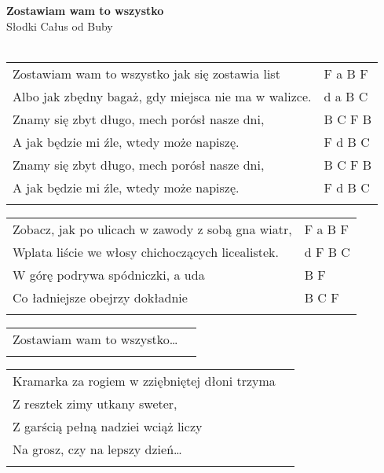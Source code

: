 \documentclass[a5paper]{article}
\begin{document}


\noindent
\fontsize{12pt}{15pt}\selectfont
\textbf{Zostawiam wam to wszystko} \\
\fontsize{8pt}{10pt}\selectfont
Słodki Całus od Buby \\ \\
\fontsize{10pt}{12pt}\selectfont

\begin{tabular}{@{}p{8.50cm}p{3cm}@{}}
\noindent
Zostawiam wam to wszystko jak się zostawia list & F a B F\\
Albo jak zbędny bagaż, gdy miejsca nie ma w walizce. & d a B C\\
Znamy się zbyt długo, mech porósł nasze dni, & B C F B\\
A jak będzie mi źle, wtedy może napiszę. & F d B C\\
Znamy się zbyt długo, mech porósł nasze dni, & B C F B\\
A jak będzie mi źle, wtedy może napiszę. & F d B C \\ \\
\end{tabular}

\noindent
\begin{tabular}{@{}p{9.50cm}p{3cm}@{}}
Zobacz, jak po ulicach w zawody z sobą gna wiatr, & F a B F \\
Wplata liście we włosy chichoczących licealistek. & d F B C \\
W górę podrywa spódniczki, a uda & B F\\
Co ładniejsze obejrzy dokładnie & B C F \\\\
\end{tabular}

\noindent
\begin{tabular}{@{}p{8.50cm}p{3cm}@{}}
Zostawiam wam to wszystko… \\ \\
\end{tabular}

\noindent
\begin{tabular}{@{}p{8.50cm}p{3cm}@{}}
Kramarka za rogiem w zziębniętej dłoni trzyma\\
Z resztek zimy utkany sweter,\\
Z garścią pełną nadziei wciąż liczy\\
Na grosz, czy na lepszy dzień… \\ \\
\end{tabular}
\end{document}
